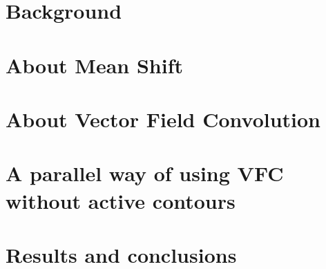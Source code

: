 \documentclass[11pt,a4paper,twoside,openright,titlepage]{book}
\begin{document}
\frontmatter




\cleardoublepage
\setcounter{page}{1}

\cleardoublepage
\setcounter{page}{1}
\tableofcontents

\mainmatter


\part{Background}

\part{About Mean Shift}

\part{About Vector Field Convolution}

\part{A parallel way of using VFC without active contours}

\part{Results and conclusions}


\backmatter

\listoffigures
\listoftables

\printbibliography[heading=bibintoc]
\end{document}
